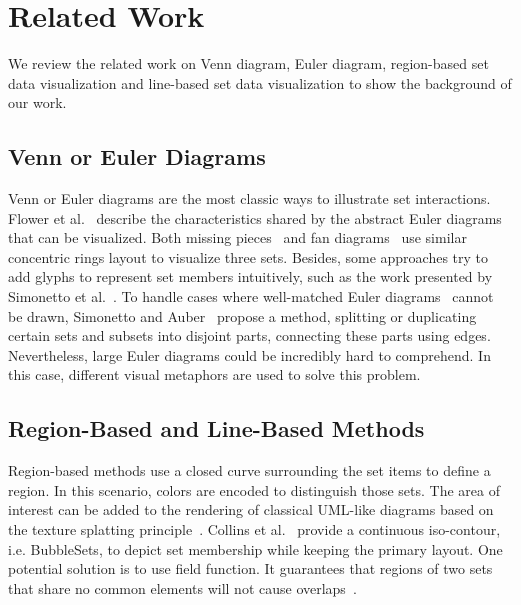 \section{Related Work}
\label{section:relatedwork}

We review the related work on Venn diagram, Euler diagram,
region-based set data visualization and line-based set data visualization 
to show the background of our work.

\subsection{Venn or Euler Diagrams}

Venn or Euler diagrams are the most classic ways to illustrate set interactions.
Flower et al.~\cite{flower2008euler} describe the characteristics shared by the abstract
Euler diagrams that can be visualized.
Both missing pieces~\cite{koshman2013metasearch,stapleton2010inductively} and fan diagrams~\cite{kim2007visualizing}
use similar concentric rings layout to visualize three sets.
Besides, some approaches try to add glyphs to represent set members intuitively,
such as the work presented by Simonetto et al.~\cite{simonetto2009fully}.
To handle cases where well-matched Euler diagrams~\cite{alsallakh2016state} cannot be drawn,
Simonetto and Auber~\cite{simonetto2008visualise} propose a method,
splitting or duplicating certain sets and subsets into disjoint parts,
connecting these parts using edges.
Nevertheless, large Euler diagrams could be incredibly hard to comprehend.
In this case, different visual metaphors are used to solve this problem.


\subsection{Region-Based and Line-Based Methods}

Region-based methods use a closed curve surrounding the set items to define a region.
In this scenario, colors are encoded to distinguish those sets.
The area of interest can be added to the rendering of classical UML-like diagrams
based on the texture splatting principle~\cite{byelas2006visualization}.
Collins et al.~\cite{collins2009bubble} provide a continuous iso-contour,
i.e. BubbleSets, to depict set membership while keeping the primary layout.
One potential solution is to use field function.
It guarantees that regions of two sets that share no common elements will not cause overlaps~\cite{vihrovs2014inverse}.

